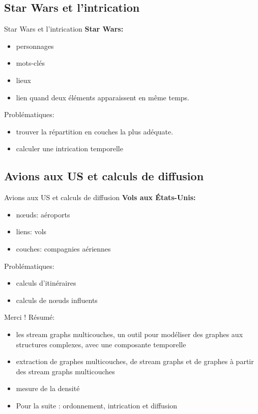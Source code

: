 \documentclass[15pt]{beamer}
\def \stgms {stream graphs multicouches}
\begin{document}
\subsection{Star Wars et l'intrication }
\begin{frame}{Star Wars et l'intrication}
    \textbf{Star Wars: }
    \begin{itemize}
        \item personnages
        \item mots-clés
        \item lieux 
        \item lien quand deux éléments apparaissent en même temps.
    \end{itemize}
    Problématiques: 
    \begin{itemize}
        \item trouver la répartition en couches la plus adéquate.
        \item calculer une intrication \og temporelle \fg{}
    \end{itemize}
\end{frame}

\subsection{Avions aux US et calculs de diffusion}
\begin{frame}{Avions aux US et calculs de diffusion}
    \textbf{Vols aux États-Unis:}
    \begin{itemize}
        \item n\oe{}uds: aéroports
        \item liens: vols
        \item couches: compagnies aériennes
    \end{itemize}
    Problématiques:
    \begin{itemize}
        \item calculs d'itinéraires
        \item calculs de n\oe{}uds influents
    \end{itemize}
\end{frame}

\begin{frame}{Merci !}
	Résumé: 
	\begin{itemize}
	    \item les \stgms{}, un outil pour modéliser des graphes aux structures complexes, avec une composante temporelle
	    \item extraction de graphes multicouches, de stream graphs et de graphes à partir des \stgms{}
	    \item mesure de la densité
	    \item Pour la suite : ordonnement, intrication et diffusion
	\end{itemize}
\end{frame}
\end{document}
